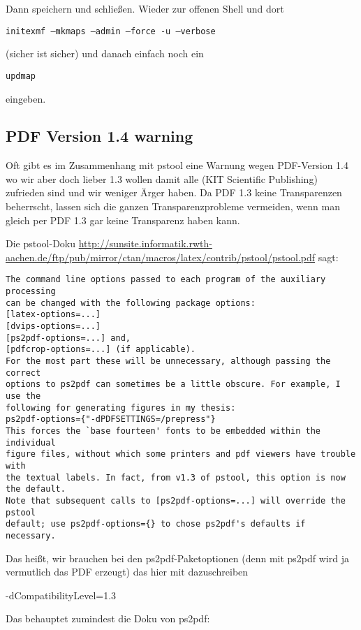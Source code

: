 Dann speichern und schließen. Wieder zur offenen Shell und dort

\texttt{initexmf --mkmaps --admin --force -u --verbose}

(sicher ist sicher) und danach einfach noch ein

\texttt{updmap}

eingeben.

\subsection{PDF Version 1.4 warning}
Oft gibt es im Zusammenhang mit pstool eine Warnung wegen PDF-Version 1.4 wo wir aber doch lieber 1.3 wollen damit alle (\zB KIT Scientific Publishing) zufrieden sind und wir weniger Ärger haben. Da PDF 1.3 keine Transparenzen beherrscht, lassen sich die ganzen Transparenzprobleme vermeiden, wenn man gleich per PDF 1.3 gar keine Transparenz haben kann.

Die pstool-Doku
\url{http://sunsite.informatik.rwth-aachen.de/ftp/pub/mirror/ctan/macros/latex/contrib/pstool/pstool.pdf}
sagt:

{\scriptsize
\begin{verbatim}
The command line options passed to each program of the auxiliary processing
can be changed with the following package options:
[latex-options=...]
[dvips-options=...]
[ps2pdf-options=...] and,
[pdfcrop-options=...] (if applicable).
For the most part these will be unnecessary, although passing the correct
options to ps2pdf can sometimes be a little obscure. For example, I use the
following for generating figures in my thesis:
ps2pdf-options={"-dPDFSETTINGS=/prepress"}
This forces the `base fourteen' fonts to be embedded within the individual
figure files, without which some printers and pdf viewers have trouble with
the textual labels. In fact, from v1.3 of pstool, this option is now the default.
Note that subsequent calls to [ps2pdf-options=...] will override the pstool
default; use ps2pdf-options={} to chose ps2pdf's defaults if necessary.
\end{verbatim}
}


Das heißt, wir brauchen bei den ps2pdf-Paketoptionen (denn mit ps2pdf wird ja vermutlich das PDF erzeugt) das hier mit dazuschreiben

-dCompatibilityLevel=1.3

Das behauptet zumindest die Doku von ps2pdf:

